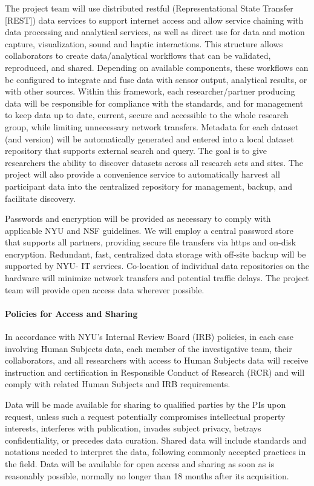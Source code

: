 The project team will use distributed restful (Representational State Transfer [REST]) data services to support internet access and allow service chaining with data processing and analytical services, as well as direct use for data and motion capture, visualization, sound and haptic interactions. This structure allows collaborators to create data/analytical workflows that can be validated, reproduced, and shared. Depending on available components, these workflows can be configured to integrate and fuse data with sensor output, analytical results, or with other sources. Within this framework, each researcher/partner producing data will be responsible for compliance with the standards, and for management to keep data up to date, current, secure and accessible to the whole research group, while limiting unnecessary network transfers. Metadata for each dataset (and version) will be automatically generated and entered into a local dataset repository that supports external search and query. The goal is to give researchers the ability to discover datasets across all research sets and sites. The project will also provide a convenience service to automatically harvest all participant data into the centralized repository for management, backup, and facilitate discovery.

Passwords and encryption will be provided as necessary to comply with applicable NYU and NSF guidelines. We will employ a central password store that supports all partners, providing secure file transfers via https and on-disk encryption. Redundant, fast, centralized data storage with off-site backup will be supported by NYU- IT services. Co-location of individual data repositories on the hardware will minimize network transfers and potential traffic delays. The project team will provide open access data wherever possible.

\paragraph{Policies for Access and Sharing}
In accordance with NYU’s Internal Review Board (IRB) policies, in each case involving Human Subjects data, each member of the investigative team, their collaborators, and all researchers with access to Human Subjects data will receive instruction and certification in Responsible Conduct of Research (RCR) and will comply with related Human Subjects and IRB requirements.

Data will be made available for sharing to qualified parties by the PIs upon request, unless such a request potentially compromises intellectual property interests, interferes with publication, invades subject privacy, betrays confidentiality, or precedes data curation. Shared data will include standards and notations needed to interpret the data, following commonly accepted practices in the field. Data will be available for open access and sharing as soon as is reasonably possible, normally no longer than 18 months after its acquisition.

